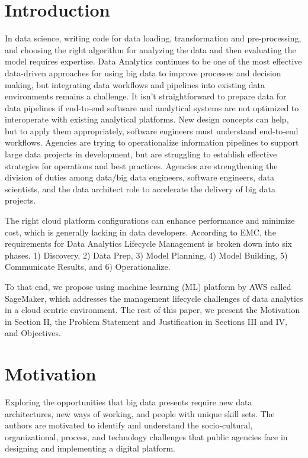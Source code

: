 \documentclass[conference]{IEEEtran}
\begin{document}
\section{Introduction}
In data science, writing code for data loading, transformation and pre-processing, and choosing the right algorithm for analyzing the data and then evaluating the model requires expertise.  Data Analytics continues to be one of the most effective data-driven approaches for using big data to improve processes and decision making, but integrating data workflows and pipelines into existing data environments remains a challenge. It isn't straightforward to prepare data for data pipelines if end-to-end software and analytical systems are not optimized to interoperate with existing analytical platforms. New design concepts can help, but to apply them appropriately, software engineers must understand end-to-end workflows.  Agencies are trying to operationalize information pipelines to support large data projects in development, but are struggling to establish effective strategies for operations and best practices.  Agencies are strengthening the division of duties among data/big data engineers, software engineers, data scientists, and the data architect role to accelerate the delivery of big data projects. 

The right cloud platform configurations can enhance performance and minimize cost, which is generally lacking in data developers. According to EMC\cite{EMC}, the requirements for Data Analytics Lifecycle Management is broken down into six phases. 1) Discovery, 2) Data Prep, 3) Model Planning, 4) Model Building, 5) Communicate Results, and 6) Operationalize.

To that end, we propose using machine learning (ML) platform by AWS called SageMaker\cite{SageMaker}, which addresses the management lifecycle challenges of data analytics in a cloud centric environment.  The rest of this paper, we present the Motivation in Section II, the Problem Statement and Justification in Sections III and IV, and Objectives.
%
%
%
\section{Motivation}
Exploring the opportunities that big data presents require new data architectures,  new ways of working, and people with unique skill sets. The authors are motivated to identify and understand the socio-cultural, organizational, process, and technology challenges that public agencies face in designing and implementing a digital platform.  
\end{document}
